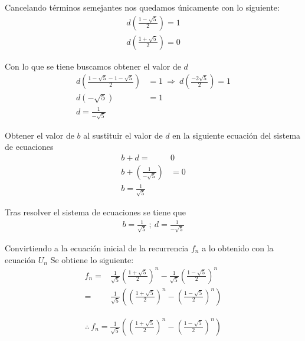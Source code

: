 \documentclass[letterpaper,11pt, fleqn]{article}
\begin{document}
Cancelando términos semejantes nos quedamos únicamente con lo siguiente:
\begin{equation*}
\begin{aligned}
	d(\frac{1 - \sqrt{5}}{2}) = 1\\
	d(\frac{1 + \sqrt{5}}{2}) = 0
\end{aligned}
\end{equation*}

Con lo que se tiene buscamos obtener el valor de $d$
\begin{equation*}
\begin{aligned}
	d(\frac{1 - \sqrt{5} -1 - \sqrt{5}}{2}) &= 1 \ \Rightarrow \ d(\frac{-2\sqrt{5}}{2}) = 1 \\
	d(-\sqrt{5}) &= 1 \\ d = \frac{1}{-\sqrt{5}}
\end{aligned}
\end{equation*}
\newpage

Obtener el valor de $b$ al sustituir el valor de $d$ en la siguiente ecuación del sistema de ecuaciones 
\begin{equation*}
\begin{aligned}
	b + d =& 0 \\
	b + (\frac{1}{-\sqrt{5}}) &= 0 \\
	 b = \frac{1}{\sqrt{5}}
\end{aligned}
\end{equation*}

Tras resolver el sistema de ecuaciones se tiene que
\begin{equation*}
	\begin{aligned}
		b = \frac{1}{\sqrt{5}} \ ; \ d = \frac{1}{-\sqrt{5}}
	\end{aligned}
\end{equation*}

Convirtiendo a la ecuación inicial de la recurrencia $f_{n}$ a lo obtenido con la ecuación $U_{n}$ \smallbreak
Se obtiene lo siguiente:
\begin{equation*}
\begin{aligned}
	f_{n} =& \frac{1}{\sqrt{5}} (\frac{1 + \sqrt{5}}{2})^{n} - \frac{1}{\sqrt{5}} (\frac{1 - \sqrt{5}}{2})^{n} \\
	=& \frac{1}{\sqrt{5}} ((\frac{1 + \sqrt{5}}{2})^{n} - (\frac{1 - \sqrt{5}}{2})^{n})
\end{aligned}
\end{equation*}

\begin{equation*}
\begin{aligned}
	\therefore \ f_{n} = \frac{1}{\sqrt{5}} ((\frac{1 + \sqrt{5}}{2})^{n} - (\frac{1 - \sqrt{5}}{2})^{n})
\end{aligned}
\end{equation*}
\end{document}
